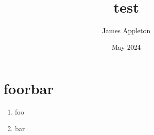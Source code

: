\documentclass{article}
\title{test}
\author{James Appleton}
\date{May 2024}
\begin{document}
\section{foorbar}
\begin{enumerate}
	\item foo
	\item bar
\end{enumerate}
\end{document}
